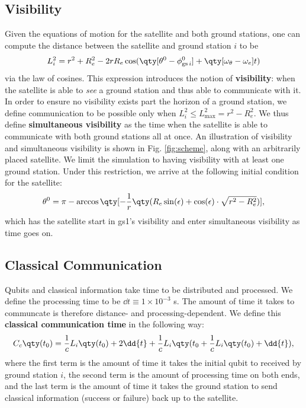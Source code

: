 
\subsection{Visibility}

Given the equations of motion for the satellite and both ground stations, one can compute the distance between the satellite and ground station $i$ to be
\begin{equation}
    L_i^2 = r^2 + R_e^2 - 2 r R_e \cos(\qty[\theta^0 - \phi^0_{\text{gs}\, i}] + \qty[\omega_\theta - \omega_e] t)
\end{equation}
via the law of cosines. This expression introduces the notion of \textbf{visibility}: when the satellite is able to \textit{see} a ground station and thus able to communicate with it. In order to ensure no visibility exists part the horizon of a ground station, we define communication to be possible only when $L_i^2 \leqslant L_{\text{max}}^2 = r^2 - R_e^2$. We thus define \textbf{simultaneous visibility} as the time when the satellite is able to communicate with both ground stations all at once. An illustration of \colorbox{green!20}{visibility} and \colorbox{green!50}{simultaneous visibility} is shown in Fig. \ref{fig:scheme}, along with an arbitrarily placed satellite. We limit the simulation to having visibility with at least one ground station. Under this restriction, we arrive at the following initial condition for the satellite:
\begin{equation}
    \theta^0 = \pi - \arccos\qty[- \frac1r \qty(R_e \sin(\epsilon) + \cos(\epsilon) \cdot \sqrt{r^{2} - R_e^2})],
\end{equation}
which has the satellite start in gs1's visibility and enter simultaneous visibility as time goes on.


\subsection{Classical Communication}

Qubits and classical information take time to be distributed and processed. We define the processing time to be $\dd{t} \equiv 1 \times 10^{-3}$ s. The amount of time it takes to communcate is therefore distance- and processing-dependent. We define this \textbf{classical communication time} in the following way:
\begin{equation}
    C_c\qty(t_0) = \frac1c L_i\qty(t_0) + 2\dd{t} + \frac1c L_i\qty(t_0 + \frac1c L_i\qty(t_0) + \dd{t}),
\end{equation}
where the first term is the amount of time it takes the initial qubit to received by ground station $i$, the second term is the amount of processing time on both ends, and the last term is the amount of time it takes the ground station to send classical information (success or failure) back up to the satellite.

